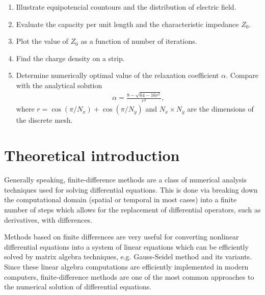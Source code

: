 \documentclass[11pt,a4paper]{article}
\begin{document}
\begin{enumerate}[label=(\alph*)]
    \item Illustrate equipotencial countours and the distribution of electric field.
    \item Evaluate the capacity per unit length and the characteristic impedance $Z_0$.
    \item Plot the value of $Z_0$ as a function of number of iterations.
    \item Find the charge density on a strip.
    \item Determine numerically optimal value of the relaxation coefficient $\alpha$. Compare with the analytical solution
    \begin{align*}
        \alpha = \frac{8-\sqrt{64-16r^2}}{r^2},
    \end{align*}
    where $r = \cos(\pi/N_x) + \cos(\pi/N_y)$ and $N_x \times N_y$ are the dimensions of the discrete mesh.
\end{enumerate}

\newpage\section{Theoretical introduction}
Generally speaking, finite-difference methods are a class of numerical analysis techniques used for solving differential equations. This is done via breaking down the computational domain (spatial or temporal in most cases) into a finite number of steps which allows for the replacement of differential operators, such as derivatives, with differences.

Methods based on finite differences are very useful for converting nonlinear differential equations into a system of linear equations which can be efficiently solved by matrix algebra techniques, e.g. Gauss-Seidel method and its variants. Since these linear algebra computations are efficiently implemented in modern computers, finite-difference methods are one of the most common approaches to the numerical solution of differential equations.
\end{document}
